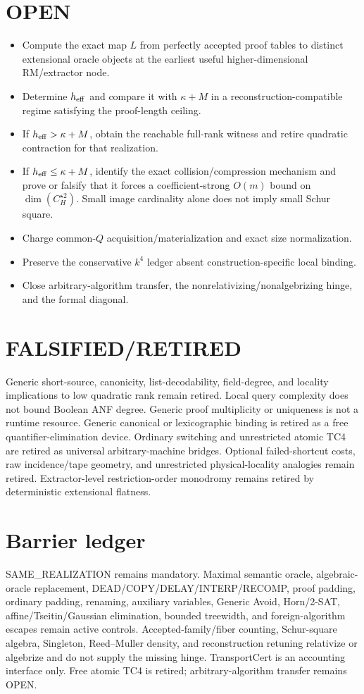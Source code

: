 \documentclass[11pt]{article}
\begin{document}
\section*{OPEN}
\begin{itemize}
\item Compute the exact map \(L\) from perfectly accepted proof tables to distinct extensional oracle objects at the earliest useful higher-dimensional RM/extractor node.
\item Determine \(h_{\rm eff}\) and compare it with \(\kappa+M\) in a reconstruction-compatible regime satisfying the proof-length ceiling.
\item If \(h_{\rm eff}>\kappa+M\), obtain the reachable full-rank witness and retire quadratic contraction for that realization.
\item If \(h_{\rm eff}\le\kappa+M\), identify the exact collision/compression mechanism and prove or falsify that it forces a coefficient-strong \(O(m)\) bound on \(\dim(C_H^{\star2})\). Small image cardinality alone does not imply small Schur square.
\item Charge common-\(Q\) acquisition/materialization and exact size normalization.
\item Preserve the conservative \(k^4\) ledger absent construction-specific local binding.
\item Close arbitrary-algorithm transfer, the nonrelativizing/nonalgebrizing hinge, and the formal diagonal.
\end{itemize}

\section*{FALSIFIED/RETIRED}
Generic short-source, canonicity, list-decodability, field-degree, and locality implications to low quadratic rank remain retired. Local query complexity does not bound Boolean ANF degree. Generic proof multiplicity or uniqueness is not a runtime resource. Generic canonical or lexicographic binding is retired as a free quantifier-elimination device. Ordinary switching and unrestricted atomic TC4 are retired as universal arbitrary-machine bridges. Optional failed-shortcut costs, raw incidence/tape geometry, and unrestricted physical-locality analogies remain retired. Extractor-level restriction-order monodromy remains retired by deterministic extensional flatness.

\section*{Barrier ledger}
SAME_REALIZATION remains mandatory. Maximal semantic oracle, algebraic-oracle replacement, DEAD/COPY/DELAY/INTERP/RECOMP, proof padding, ordinary padding, renaming, auxiliary variables, Generic Avoid, Horn/2-SAT, affine/Tseitin/Gaussian elimination, bounded treewidth, and foreign-algorithm escapes remain active controls. Accepted-family/fiber counting, Schur-square algebra, Singleton, Reed--Muller density, and reconstruction retuning relativize or algebrize and do not supply the missing hinge. TransportCert is an accounting interface only. Free atomic TC4 is retired; arbitrary-algorithm transfer remains OPEN.
\end{document}
